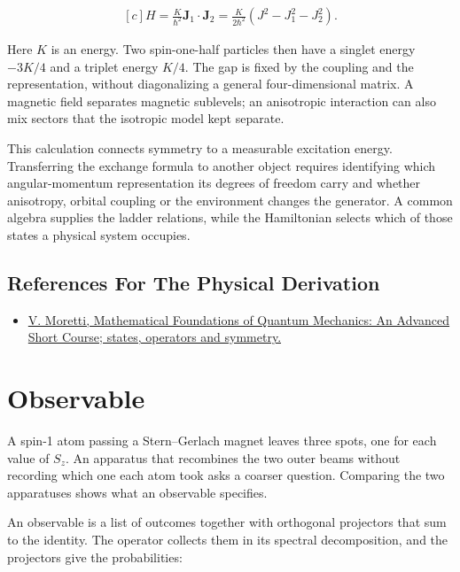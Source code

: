 \documentclass[11pt,oneside]{book}
\newenvironment{centeredalign}{\[\begin{gathered}[c]}{\end{gathered}\]}
\begin{document}
\begin{centeredalign}
H=\frac{K}{\hbar^2}\mathbf J_1\cdot\mathbf J_2
=\frac{K}{2\hbar^2}(J^2-J_1^2-J_2^2).
\end{centeredalign}

Here \(K\) is an energy. Two spin-one-half particles then have a singlet energy \(-3K/4\) and a triplet energy \(K/4\). The gap is fixed by the coupling and the representation, without diagonalizing a general four-dimensional matrix. A magnetic field separates magnetic sublevels; an anisotropic interaction can also mix sectors that the isotropic model kept separate.

This calculation connects symmetry to a measurable excitation energy. Transferring the exchange formula to another object requires identifying which angular-momentum representation its degrees of freedom carry and whether anisotropy, orbital coupling or the environment changes the generator. A common algebra supplies the ladder relations, while the Hamiltonian selects which of those states a physical system occupies.

\subsection*{References For The Physical Derivation}
\begin{itemize}
\item \href{https://arxiv.org/abs/1508.06951}{V. Moretti, Mathematical Foundations of Quantum Mechanics: An Advanced Short Course; states, operators and symmetry.}
\end{itemize}





\clearpage

\section{Observable}

\label{topic:observable}

A spin-1 atom passing a Stern--Gerlach magnet leaves three spots, one for each value of \(S_z\). An apparatus that recombines the two outer beams without recording which one each atom took asks a coarser question. Comparing the two apparatuses shows what an observable specifies.

An observable is a list of outcomes together with orthogonal projectors that sum to the identity. The operator collects them in its spectral decomposition, and the projectors give the probabilities:
\end{document}
